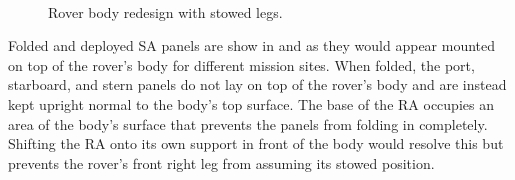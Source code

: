 \begin{figure}[h]
\begin{subfigure}[t]{\subfigureWidth}
		\label{fig:sub:rover-body-redesign-stowed-legs-after}
	\end{subfigure}\\[0.8ex]
    \caption[Rover body redesign with stowed legs]
            {Rover body redesign with stowed legs.}
    \label{fig:rover-body-redesign-stowed-legs}
\vspace{-2ex}
\end{figure}


Folded and deployed \ac{SA} panels are show in  and  as they would appear mounted on top of the rover's body for different mission sites. When folded, the port, starboard, and stern panels do not lay on top of the rover's body and are instead kept upright normal to the body's top surface. The base of the \ac{RA} occupies an area of the body's surface that prevents the panels from folding in completely. Shifting the \ac{RA} onto its own support in front of the body would resolve this but prevents the rover's front right leg from assuming its stowed position.

\vspace{0.5cm}

